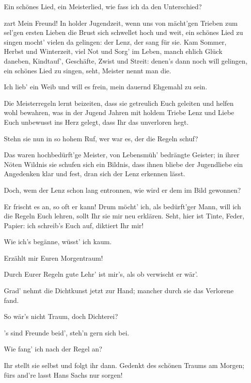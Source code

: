 \begin{drama}
\Waltherspeaks
Ein schönes Lied, ein Meisterlied,
wie fass ich da den Unterschied?

\Sachsspeaks
zart
Mein Freund! In holder Jugendzeit,
wenn uns von mächt'gen Trieben
zum sel'gen ersten Lieben
die Brust sich schwellet hoch und weit,
ein schönes Lied zu singen
mocht' vielen da gelingen:
der Lenz, der sang für sie.
Kam Sommer, Herbst und Winterzeit,
viel Not und Sorg' im Leben,
manch ehlich Glück daneben,
Kindtauf', Geschäfte, Zwist und Streit:
denen's dann noch will gelingen,
ein schönes Lied zu singen,
seht, Meister nennt man die.

\Waltherspeaks
Ich lieb' ein Weib und will es frein,
mein dauernd Ehgemahl zu sein.

\Sachsspeaks
Die Meisterregeln lernt beizeiten,
dass sie getreulich Euch geleiten
und helfen wohl bewahren,
was in der Jugend Jahren
mit holdem Triebe Lenz und Liebe
Euch unbewusst ins Herz gelegt,
dass Ihr das unverloren hegt.

\Waltherspeaks
Stehn sie nun in so hohem Ruf,
wer war es, der die Regeln schuf?

\Sachsspeaks
Das waren hochbedürft'ge Meister,
von Lebensmüh' bedrängte Geister;
in ihrer Nöten Wildnis
sie schufen sich ein Bildnis,
dass ihnen bliebe der Jugendliebe
ein Angedenken klar und fest,
dran sich der Lenz erkennen lässt.

\Waltherspeaks
Doch, wem der Lenz schon lang entronnen,
wie wird er dem im Bild gewonnen?

\Sachsspeaks
Er frischt es an, so oft er kann!
Drum möcht' ich, als bedürft'ger Mann,
will ich die Regeln Euch lehren,
sollt Ihr sie mir neu erklären.
Seht, hier ist Tinte, Feder, Papier:
ich schreib's Euch auf, diktiert Ihr mir!

\Waltherspeaks
Wie ich's begänne, wüsst' ich kaum.

\Sachsspeaks
Erzählt mir Euren Morgentraum!

\Waltherspeaks
Durch Eurer Regeln gute Lehr'
ist mir's, als ob verwischt er wär'.

\Sachsspeaks
Grad' nehmt die Dichtkunst jetzt zur Hand;
mancher durch sie das Verlorene fand.

\Waltherspeaks
So wär's nicht Traum, doch Dichterei?

\Sachsspeaks
's sind Freunde beid', steh'n gern sich bei.

\Waltherspeaks
Wie fang' ich nach der Regel an?

\Sachsspeaks
Ihr stellt sie selbst und folgt ihr dann.
Gedenkt des schönen Traums am Morgen;
fürs and're lasst Hans Sachs nur sorgen!


\end{drama}
